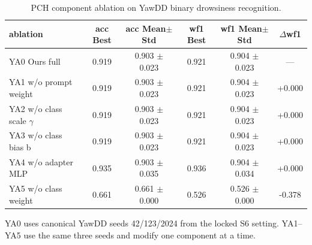 \begin{table}[t]
\centering
\small
\begin{tabular}{lccccc}
\toprule
ablation & acc Best & acc Mean$\pm$Std & wf1 Best & wf1 Mean$\pm$Std & $\Delta$wf1 \\
\midrule
YA0 Ours full & 0.919 & 0.903 $\pm$ 0.023 & 0.921 & 0.904 $\pm$ 0.023 & --- \\
YA1 w/o prompt weight & 0.919 & 0.903 $\pm$ 0.023 & 0.921 & 0.904 $\pm$ 0.023 & +0.000 \\
YA2 w/o class scale $\gamma$ & 0.919 & 0.903 $\pm$ 0.023 & 0.921 & 0.904 $\pm$ 0.023 & +0.000 \\
YA3 w/o class bias b & 0.919 & 0.903 $\pm$ 0.023 & 0.921 & 0.904 $\pm$ 0.023 & +0.000 \\
YA4 w/o adapter MLP & 0.935 & 0.903 $\pm$ 0.035 & 0.936 & 0.904 $\pm$ 0.034 & +0.000 \\
YA5 w/o class weight & 0.661 & 0.661 $\pm$ 0.000 & 0.526 & 0.526 $\pm$ 0.000 & -0.378 \\
\bottomrule
\end{tabular}
\vspace{2pt}\footnotesize YA0 uses canonical YawDD seeds 42/123/2024 from the locked S6 setting. YA1--YA5 use the same three seeds and modify one component at a time.
\caption{PCH component ablation on YawDD binary drowsiness recognition.}
\label{tab:yawdd_pch_ablation}
\end{table}
